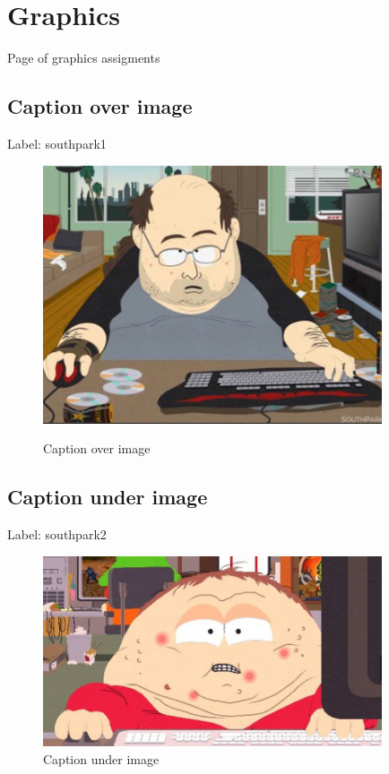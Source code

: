 \section{Graphics}
Page of graphics assigments

\subsection{Caption over image}
Label: southpark1
\begin{figure}[H]
    \centering
    \caption{Caption over image}
    \includegraphics[width=10cm]{Pictures/southpark1.jpg}
    \label{fig:southpark1}
\end{figure}
\subsection{Caption under image}
Label: southpark2
\begin{figure}[H]
    \centering
    \includegraphics[width=10cm]{Pictures/southpark2.jpg}
    \caption{Caption under image}
    \label{fig:southpark2}
\end{figure}
